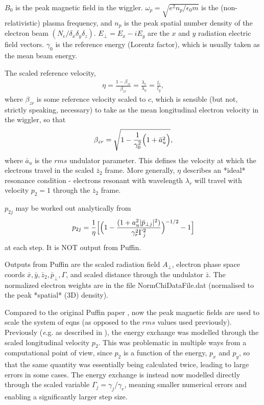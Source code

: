 \documentclass[12pt]{article}%
\begin{document}
$B_0$ is the peak magnetic field in the wiggler.
$\omega_p = \sqrt{e^2 n_p / \epsilon_0 m}$ is the (non-relativistic) plasma frequency, and $n_p$ is the peak spatial number density of the electron beam $(N_e / \delta_x \delta_y \delta_z)$. 
$E_\bot = E_x - i E_y$ are the $x$ and $y$ radiation electric field vectors. $\gamma_0$ is the reference energy (Lorentz factor), which is usually taken as the mean beam energy.

The scaled reference velocity, 
\begin{align}
\eta = \frac{1 - \beta_{zr}}{\beta_{zr}} = \frac{\lambda_r}{\lambda_u} = \frac{l_c}{l_g},
\end{align}
where $\beta_{zr}$ is some reference velocity scaled to $c$, which is sensible (but not, strictly speaking, necessary) to take as the mean longitudinal electron velocity in the wiggler, so that
\begin{align}
\beta_{zr} = \sqrt{ 1 - \frac{1}{\gamma_0^2}\Bigl(1 + \bar{a}_u^2\Bigr)},
\end{align}
where $\bar{a}_u$ is the $rms$ undulator parameter.
This defines the velocity at which the electrons travel in the scaled $\bar{z}_2$ frame. More generally, $\eta$ describes an *ideal* resonance condition - electrons resonant with wavelength $\lambda_r$ will travel with velocity $p_2=1$ through the $\bar{z}_2$ frame. 




$p_{2j}$ may be worked out analytically from 
\begin{align}
p_{2j} = \frac{1}{\eta}\Bigl[ \Bigl(  1 - \frac{(1 + a_u^2 | \bar{p}_{\bot j} |^2)}{\gamma_r^2 \Gamma^2_j}  \Bigr)^{-1/2} - 1   \Bigr]
\end{align}
at each step. It is NOT output from Puffin.

Outputs from Puffin are the scaled radiation field $A_\bot$, electron phase space coords $\bar{x}, \bar{y}, \bar{z}_2, \bar{p}_\bot, \Gamma$, and scaled distance through the undulator $\bar{z}$. The normalized electron weights are in the file NormChiDataFile.dat (normalised to the peak *spatial* (3D) density).



Compared to the original Puffin paper \cite{puffin}, now the peak magnetic fields are used to scale the system of eqns (as opposed to the $rms$ values used previously). Previously (\textit e.g. as described in \cite{puffin}), the energy exchange was modelled through the scaled longitudinal velocity $p_2$. This was problematic in multiple ways from a computational point of view, since $p_2$ is a function of the energy, $p_x$ and $p_y$, so that the same quantity was essentially being calculated twice, leading to large errors in some cases. The energy exchange is instead now modelled directly through the scaled variable $\Gamma_j = \gamma_j / \gamma_r$, meaning smaller numerical errors and enabling a significantly larger step size. 
\end{document}
